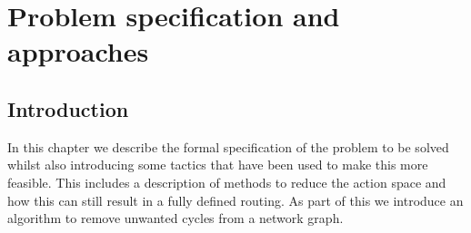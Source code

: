 \chapter{Problem specification and approaches}
\label{chapter:problem}

\section{Introduction}
In this chapter we describe the formal specification of the problem to be solved whilst also introducing some tactics that have been used to make this more feasible. This includes a description of methods to reduce the action space and how this can still result in a fully defined routing. As part of this we introduce an algorithm to remove unwanted cycles from a network graph.

